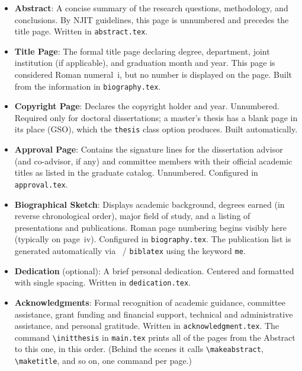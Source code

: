 \begin{itemize}
\emergencystretch=2em
\item \textbf{Abstract}: A concise summary of the research questions, methodology, and conclusions. By NJIT guidelines, this page is unnumbered and precedes the title page. Written in \texttt{abstract.tex}.

\item \textbf{Title Page}: The formal title page declaring degree, department, joint institution (if applicable), and graduation month and year. This page is considered Roman numeral~i, but no number is displayed on the page. Built from the information in \texttt{biography.tex}.

\item \textbf{Copyright Page}: Declares the copyright holder and year. Unnumbered. Required only for doctoral dissertations; a master's thesis has a blank page in its place (GSO), which the \texttt{thesis} class option produces. Built automatically.

\item \textbf{Approval Page}: Contains the signature lines for the dissertation advisor (and co-advisor, if any) and committee members with their official academic titles as listed in the graduate catalog. Unnumbered. Configured in \texttt{approval.tex}.

\item \textbf{Biographical Sketch}: Displays academic background, degrees earned (in reverse chronological order), major field of study, and a listing of presentations and publications. Roman page numbering begins visibly here (typically on page~iv). Configured in \texttt{biography.tex}. The publication list is generated automatically via \BibTeX\ / \texttt{biblatex} using the keyword \texttt{me}.

\item \textbf{Dedication} (optional): A brief personal dedication. Centered and formatted with single spacing. Written in \texttt{dedication.tex}.

\item \textbf{Acknowledgments}: Formal recognition of academic guidance, committee assistance, grant funding and financial support, technical and administrative assistance, and personal gratitude. Written in \texttt{acknowledgment.tex}. The command \verb+\initthesis+ in \texttt{main.tex} prints all of the pages from the Abstract to this one, in this order. (Behind the scenes it calls \verb+\makeabstract+, \verb+\maketitle+, and so on, one command per page.)


\end{itemize}
